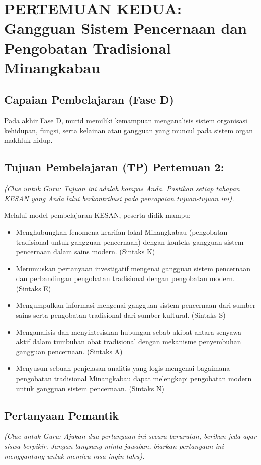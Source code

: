 \documentclass[a4paper,12pt]{article}
\begin{document}
\section{PERTEMUAN KEDUA: Gangguan Sistem Pencernaan dan Pengobatan Tradisional Minangkabau}

\subsection{Capaian Pembelajaran (Fase D)}
Pada akhir Fase D, murid memiliki kemampuan menganalisis sistem organisasi kehidupan, fungsi, serta kelainan atau gangguan yang muncul pada sistem organ makhluk hidup.

\subsection{Tujuan Pembelajaran (TP) Pertemuan 2:}
\textit{(Clue untuk Guru: Tujuan ini adalah kompas Anda. Pastikan setiap tahapan KESAN yang Anda lalui berkontribusi pada pencapaian tujuan-tujuan ini).}

Melalui model pembelajaran KESAN, peserta didik mampu:
\begin{itemize}
\item Menghubungkan fenomena kearifan lokal Minangkabau (pengobatan tradisional untuk gangguan pencernaan) dengan konteks gangguan sistem pencernaan dalam sains modern. (Sintaks K)
\item Merumuskan pertanyaan investigatif mengenai gangguan sistem pencernaan dan perbandingan pengobatan tradisional dengan pengobatan modern. (Sintaks E)
\item Mengumpulkan informasi mengenai gangguan sistem pencernaan dari sumber sains serta pengobatan tradisional dari sumber kultural. (Sintaks S)
\item Menganalisis dan menyintesiskan hubungan sebab-akibat antara senyawa aktif dalam tumbuhan obat tradisional dengan mekanisme penyembuhan gangguan pencernaan. (Sintaks A)
\item Menyusun sebuah penjelasan analitis yang logis mengenai bagaimana pengobatan tradisional Minangkabau dapat melengkapi pengobatan modern untuk gangguan sistem pencernaan. (Sintaks N)
\end{itemize}

\subsection{Pertanyaan Pemantik}
\textit{(Clue untuk Guru: Ajukan dua pertanyaan ini secara berurutan, berikan jeda agar siswa berpikir. Jangan langsung minta jawaban, biarkan pertanyaan ini menggantung untuk memicu rasa ingin tahu).}
\end{document}
